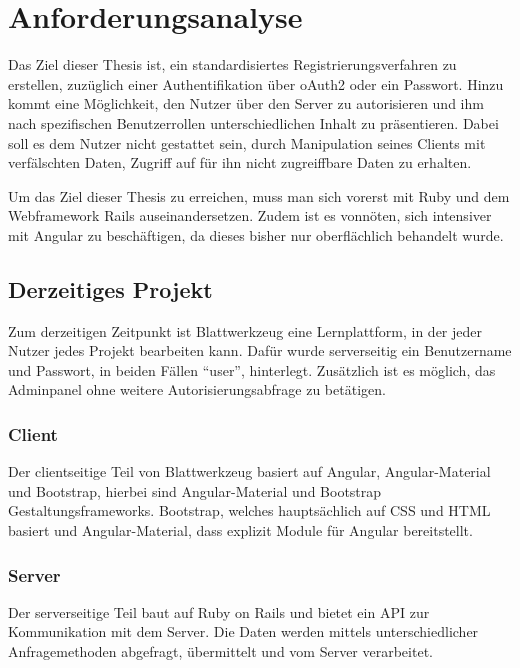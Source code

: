 \section{Anforderungsanalyse}
\label{sec:analyze}
Das Ziel dieser Thesis ist, ein standardisiertes Registrierungsverfahren zu erstellen, zuzüglich einer Authentifikation über \gls{oAuth2} oder ein Passwort. Hinzu kommt eine Möglichkeit, den Nutzer über den Server zu autorisieren und ihm nach spezifischen Benutzerrollen unterschiedlichen Inhalt zu präsentieren. Dabei soll es dem Nutzer nicht gestattet sein, durch Manipulation seines Clients mit verfälschten Daten, Zugriff auf für ihn nicht zugreiffbare Daten zu erhalten.

Um das Ziel dieser Thesis zu erreichen, muss man sich vorerst mit Ruby und dem Webframework Rails auseinandersetzen. Zudem ist es vonnöten, sich intensiver mit Angular zu beschäftigen, da dieses bisher nur oberflächlich behandelt wurde.


\subsection{Derzeitiges Projekt}
\label{sec: current_project}
Zum derzeitigen Zeitpunkt ist Blattwerkzeug eine Lernplattform, in der jeder Nutzer jedes Projekt bearbeiten kann. Dafür wurde serverseitig ein Benutzername und Passwort, in beiden Fällen \enquote{user}, hinterlegt. Zusätzlich ist es möglich, das Adminpanel ohne weitere Autorisierungsabfrage zu betätigen.

\subsubsection{Client}
Der clientseitige Teil von Blattwerkzeug basiert auf Angular, Angular-Material und Bootstrap, hierbei sind Angular-Material und Bootstrap Gestaltungsframeworks. Bootstrap, welches hauptsächlich auf \gls{CSS} und \gls{HTML} basiert und Angular-Material, dass explizit Module für Angular bereitstellt.

\subsubsection{Server}
Der serverseitige Teil baut auf Ruby on Rails und bietet ein \gls{API} zur Kommunikation mit dem Server. Die Daten werden mittels unterschiedlicher Anfragemethoden abgefragt, übermittelt und vom Server verarbeitet.

